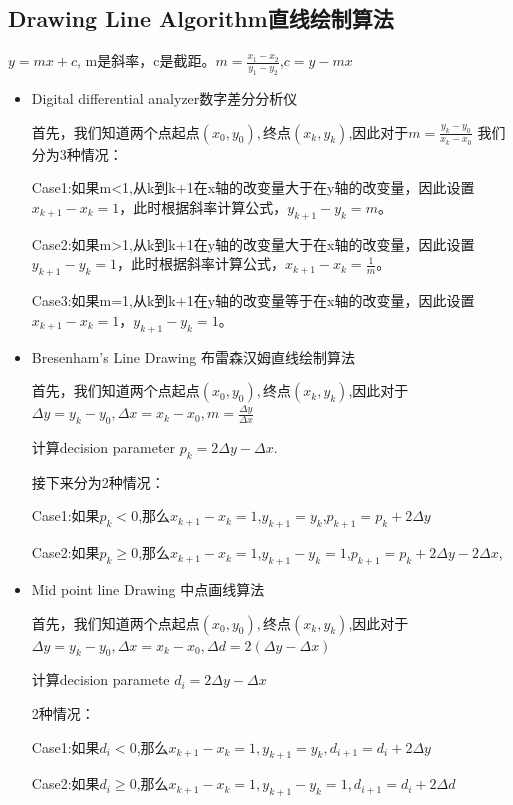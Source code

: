 \documentclass[UTF8]{ctexart}
\begin{document}
\subsection{Drawing Line Algorithm直线绘制算法}
$y=mx+c$, m是斜率，c是截距。$m=\frac{x_1-x_2}{y_1-y_2}$,$c=y-mx$
\begin{itemize}
    \item Digital differential analyzer数字差分分析仪
    
    首先，我们知道两个点$\text{起点}(x_0,y_0),\text{终点}(x_{k},y_{k})$,因此对于$m=\frac{y_{k}-y_{0}}{x_{k}-x_{0}}$
    我们分为3种情况：

    Case1:如果m<1,从k到k+1在x轴的改变量大于在y轴的改变量，因此设置$x_{k+1}-x_{k}=1$，此时根据斜率计算公式，$y_{k+1}-y_{k}=m$。

    Case2:如果m>1,从k到k+1在y轴的改变量大于在x轴的改变量，因此设置$y_{k+1}-y_{k}=1$，此时根据斜率计算公式，$x_{k+1}-x_{k}=\frac{1}{m}$。

    Case3:如果m=1,从k到k+1在y轴的改变量等于在x轴的改变量，因此设置$x_{k+1}-x_{k}=1$，$y_{k+1}-y_{k}=1$。

    \item Bresenham's Line Drawing 布雷森汉姆直线绘制算法
    
    首先，我们知道两个点$\text{起点}(x_0,y_0),\text{终点}(x_{k},y_{k})$,因此对于$\Delta y=y_{k}-y_{0}, \Delta x=x_{k}-x_{0}, m=\frac{\Delta y}{\Delta x}$

    计算decision parameter $ p_k=2\Delta y-\Delta x$.

    接下来分为2种情况：

    Case1:如果$p_{k}<0$,那么$x_{k+1}-x_{k}=1$,$y_{k+1}=y_{k}$,$p_{k+1}=p_{k}+2\Delta y$


    Case2:如果$p_{k}\geq 0$,那么$x_{k+1}-x_{k}=1$,$y_{k+1}-y_{k}=1$,$p_{k+1}=p_{k}+2\Delta y-2\Delta x$, 

    \item Mid point line Drawing 中点画线算法
    
    首先，我们知道两个点$\text{起点}(x_0,y_0),\text{终点}(x_{k},y_{k})$,因此对于$\Delta y=y_{k}-y_{0}, \Delta x=x_{k}-x_{0}, \Delta d=2(\Delta y-\Delta x)$

    计算decision paramete $d_{i}=2 \Delta y-\Delta x$

    2种情况：

    Case1:如果$d_{i}<0$,那么$x_{k+1}-x_{k}=1, y_{k+1}=y_{k}, d_{i+1}=d_{i}+2\Delta y$

    Case2:如果$d_{i}\geqslant 0$,那么$x_{k+1}-x_{k}=1, y_{k+1}-y_{k}=1, d_{i+1}=d_{i}+2\Delta d$

\end{itemize}
\end{document}
